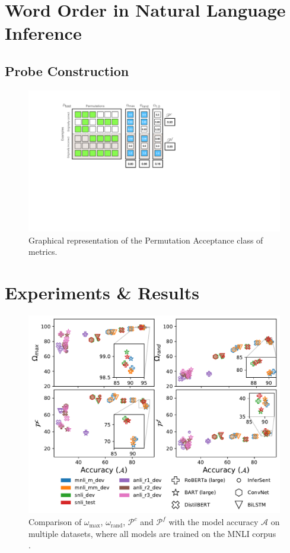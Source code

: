 \documentclass[letterpaper, 12pt]{report}
\begin{document}
\section{Word Order in Natural Language Inference}
\label{sec:org08e7337}
\subsection{Probe Construction}
\label{sec:orgaf44630}

\begin{figure}[htbp]
\centering
\includegraphics[height=0.3\textwidth]{figs/unli/nli_gen_perm_desc.pdf}
\caption{Graphical representation of the Permutation Acceptance class of metrics.}
\end{figure}

\section{Experiments \& Results}
\label{sec:org8b435b7}

\begin{figure}[htbp]
\centering
\includegraphics[width=.9\linewidth]{figs/unli/comb_plot_all.pdf}
\caption{Comparison of \(\omega_{\text{max}}\), \(\omega_{\text{rand}}\), \(\mathcal{P}^{c}\) and \(\mathcal{P}^{f}\) with the model accuracy \(\mathcal{A}\) on multiple datasets, where all models are trained on the MNLI corpus \cite{williams-etal-2018-broad}.}
\end{figure}
\end{document}
